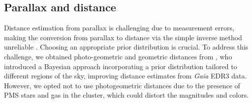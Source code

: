 \documentclass{aa}
\begin{document}
\subsection{Parallax and distance}\label{subsubsec:parallax}
Distance estimation from parallax is challenging due to measurement errors, making the conversion from parallax to distance via the simple inverse method unreliable \citep{2015PASP..127..994B,2021AJ....161..147B}. Choosing an appropriate prior distribution is crucial. To address this challenge, we obtained photo-geometric and geometric distances from \citet{2021AJ....161..147B}, who introduced a Bayesian approach incorporating a prior distribution tailored to different regions of the sky, improving distance estimates from \textit{Gaia} EDR3 data. However, we opted not to use photogeometric distances due to the presence of PMS stars and gas in the cluster, which could distort the magnitudes and colors.
\end{document}
